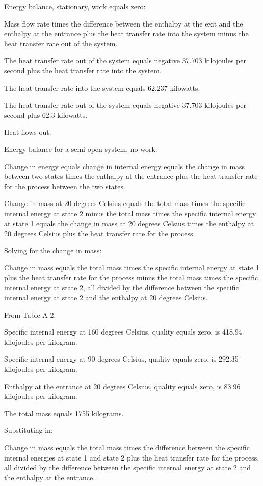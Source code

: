Energy balance, stationary, work equals zero:

Mass flow rate times the difference between the enthalpy at the exit and the enthalpy at the entrance plus the heat transfer rate into the system minus the heat transfer rate out of the system.

The heat transfer rate out of the system equals negative 37.703 kilojoules per second plus the heat transfer rate into the system.

The heat transfer rate into the system equals 62.237 kilowatts.

The heat transfer rate out of the system equals negative 37.703 kilojoules per second plus 62.3 kilowatts.

Heat flows out.

Energy balance for a semi-open system, no work:

Change in energy equals change in internal energy equals the change in mass between two states times the enthalpy at the entrance plus the heat transfer rate for the process between the two states.

Change in mass at 20 degrees Celsius equals the total mass times the specific internal energy at state 2 minus the total mass times the specific internal energy at state 1 equals the change in mass at 20 degrees Celsius times the enthalpy at 20 degrees Celsius plus the heat transfer rate for the process.

Solving for the change in mass:

Change in mass equals the total mass times the specific internal energy at state 1 plus the heat transfer rate for the process minus the total mass times the specific internal energy at state 2, all divided by the difference between the specific internal energy at state 2 and the enthalpy at 20 degrees Celsius.

From Table A-2:

Specific internal energy at 160 degrees Celsius, quality equals zero, is 418.94 kilojoules per kilogram.

Specific internal energy at 90 degrees Celsius, quality equals zero, is 292.35 kilojoules per kilogram.

Enthalpy at the entrance at 20 degrees Celsius, quality equals zero, is 83.96 kilojoules per kilogram.

The total mass equals 1755 kilograms.

Substituting in:

Change in mass equals the total mass times the difference between the specific internal energies at state 1 and state 2 plus the heat transfer rate for the process, all divided by the difference between the specific internal energy at state 2 and the enthalpy at the entrance.